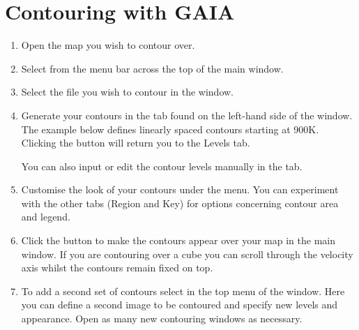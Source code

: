 \documentclass[11pt,oneside,chapters]{starlink}
\begin{document}
\section{Contouring with GAIA}
\begin{enumerate}[label=(\textbf{\arabic*})]
\item  Open the map you wish to contour over.

\item Select  from the menu bar
across the top of the main window.

\item Select the file you wish to contour in the  window.

\item Generate your contours in the  tab found on
the left-hand side of the  window. The example
below defines linearly spaced contours starting at 900K. Clicking the
 button will return you to the Levels tab.


You can also input or edit the contour levels manually in the  tab.

\item Customise the look of your contours under the
 menu. You can experiment with the other tabs
(Region and Key) for options concerning contour area and legend.


\item Click the  button to make the contours
appear over your map in the main window. If you are contouring over a
cube you can scroll through the velocity axis whilst the contours
remain fixed on top.


\item To add a second set of contours select  in the top menu of the  window. Here you
can define a second image to be contoured and specify new levels and
appearance. Open as many new contouring windows as necessary.

\end{enumerate}
\end{document}
